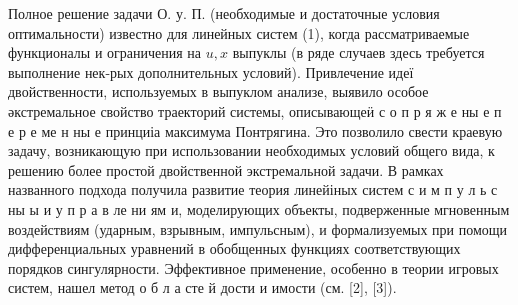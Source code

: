 \documentclass[10pt]{article}
\begin{document}
Полное решение задачи О. у. П. (необходимые и достаточные условия оптимальности) известно для линейных систем (1), когда рассматриваемые функционалы и ограничения на $u, x$ выпуклы (в ряде случаев здесь требуется выполнение нек-рых дополнительных условий). Привлечение идеї двойственности, используемых в выпуклом анализе, выявило особое әкстремальное свойство траекторий системы, описывающеӥ с о п р я ж е ны е п е р е ме н ны е принциіа максимума Понтрягина. Это позволило свести краевую задачу, возникающую при использовании необходимых условий общего вида, к решению более простой двойственной экстремальной задачи. В рамках названного подхода получила развитие теория линейіных систем с и м п у л ь с ны ы и у п р а в ле ни ям и, моделирующих объекты, подверженные мгновенным воздействиям (ударным, взрывным, импульсным), и формализуемых при помощи дифференциальных уравнений в обобщенных функциях соответствующих порядков сингулярности. Эффективное применение, особенно в теории игровых систем, нашел метод о б л а сте й дости и имости (см. [2], [3]).
\end{document}
